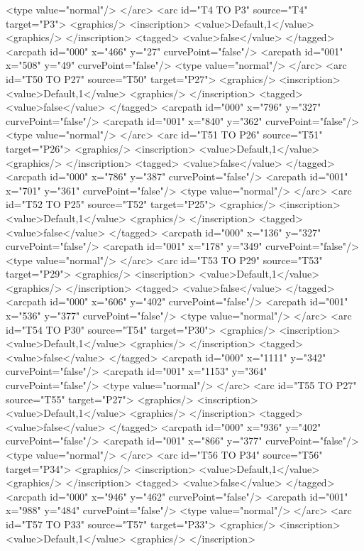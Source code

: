 <type value="normal"/>
</arc>
<arc id="T4 TO P3" source="T4" target="P3">
<graphics/>
<inscription>
<value>Default,1</value>
<graphics/>
</inscription>
<tagged>
<value>false</value>
</tagged>
<arcpath id="000" x="466" y="27" curvePoint="false"/>
<arcpath id="001" x="508" y="49" curvePoint="false"/>
<type value="normal"/>
</arc>
<arc id="T50 TO P27" source="T50" target="P27">
<graphics/>
<inscription>
<value>Default,1</value>
<graphics/>
</inscription>
<tagged>
<value>false</value>
</tagged>
<arcpath id="000" x="796" y="327" curvePoint="false"/>
<arcpath id="001" x="840" y="362" curvePoint="false"/>
<type value="normal"/>
</arc>
<arc id="T51 TO P26" source="T51" target="P26">
<graphics/>
<inscription>
<value>Default,1</value>
<graphics/>
</inscription>
<tagged>
<value>false</value>
</tagged>
<arcpath id="000" x="786" y="387" curvePoint="false"/>
<arcpath id="001" x="701" y="361" curvePoint="false"/>
<type value="normal"/>
</arc>
<arc id="T52 TO P25" source="T52" target="P25">
<graphics/>
<inscription>
<value>Default,1</value>
<graphics/>
</inscription>
<tagged>
<value>false</value>
</tagged>
<arcpath id="000" x="136" y="327" curvePoint="false"/>
<arcpath id="001" x="178" y="349" curvePoint="false"/>
<type value="normal"/>
</arc>
<arc id="T53 TO P29" source="T53" target="P29">
<graphics/>
<inscription>
<value>Default,1</value>
<graphics/>
</inscription>
<tagged>
<value>false</value>
</tagged>
<arcpath id="000" x="606" y="402" curvePoint="false"/>
<arcpath id="001" x="536" y="377" curvePoint="false"/>
<type value="normal"/>
</arc>
<arc id="T54 TO P30" source="T54" target="P30">
<graphics/>
<inscription>
<value>Default,1</value>
<graphics/>
</inscription>
<tagged>
<value>false</value>
</tagged>
<arcpath id="000" x="1111" y="342" curvePoint="false"/>
<arcpath id="001" x="1153" y="364" curvePoint="false"/>
<type value="normal"/>
</arc>
<arc id="T55 TO P27" source="T55" target="P27">
<graphics/>
<inscription>
<value>Default,1</value>
<graphics/>
</inscription>
<tagged>
<value>false</value>
</tagged>
<arcpath id="000" x="936" y="402" curvePoint="false"/>
<arcpath id="001" x="866" y="377" curvePoint="false"/>
<type value="normal"/>
</arc>
<arc id="T56 TO P34" source="T56" target="P34">
<graphics/>
<inscription>
<value>Default,1</value>
<graphics/>
</inscription>
<tagged>
<value>false</value>
</tagged>
<arcpath id="000" x="946" y="462" curvePoint="false"/>
<arcpath id="001" x="988" y="484" curvePoint="false"/>
<type value="normal"/>
</arc>
<arc id="T57 TO P33" source="T57" target="P33">
<graphics/>
<inscription>
<value>Default,1</value>
<graphics/>
</inscription>
